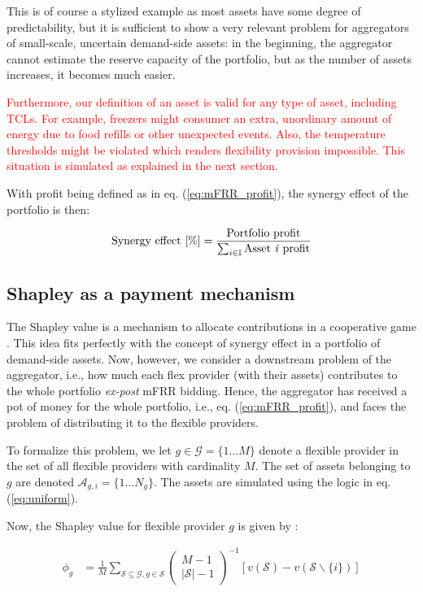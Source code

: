 \documentclass[lettersize,journal]{IEEEtran}
\newcommand{\red}[1]{\textcolor{red}{#1}}
\begin{document}
This is of course a stylized example as most assets have some degree of predictability, but it is sufficient to show a very relevant problem for aggregators of small-scale, uncertain demand-side assets: in the beginning, the aggregator cannot estimate the reserve capacity of the portfolio, but as the number of assets increases, it becomes much easier.

\red{Furthermore, our definition of an asset is valid for any type of asset, including TCLs. For example, freezers might consumer an extra, unordinary amount of energy due to food refills or other unexpected events. Also, the temperature thresholds might be violated which renders flexibility provision impossible. This situation is simulated as explained in the next section.}

With profit being defined as in eq. (\ref{eq:mFRR_profit}), the synergy effect of the portfolio is then:

\begin{align}\label{eq:synergy_effect}
    \text{Synergy effect [\%]} = \frac{ \text{Portfolio profit} }{ \sum_{i \in \mathbb{I}} \text{Asset \textit{i} profit} }
\end{align}


\subsection{Shapley as a payment mechanism}

The Shapley value is a mechanism to allocate contributions in a cooperative game \cite{shapley1997value}. This idea fits perfectly with the concept of synergy effect in a portfolio of demand-side assets. Now, however, we consider a downstream problem of the aggregator, i.e., how much each flex provider (with their assets) contributes to the whole portfolio \textit{ex-post} mFRR bidding. Hence, the aggregator has received a pot of money for the whole portfolio, i.e., eq. (\ref{eq:mFRR_profit}), and faces the problem of distributing it to the flexible providers.

To formalize this problem, we let $g \in \mathcal{G} = \{1 \hdots M \}$ denote a flexible provider in the set of all flexible providers with cardinality $M$. The set of assets belonging to $g$ are denoted $\mathcal{A}_{g,i} = \{1 \hdots N_g \}$. The assets are simulated using the logic in eq. (\ref{eq:uniform}).

Now, the Shapley value for flexible provider $g$ is given by \cite{shapley1997value}:

\begin{align}\label{eq:shap}
    \phi_g & = \frac{1}{M} \sum_{\mathcal{S} \subseteq \mathcal{G}, g \in \mathcal{S}}\left(\begin{array}{c}
                                                                                                    M-1 \\
                                                                                                    |\mathcal{S}|-1
                                                                                                \end{array}\right)^{-1}[v(\mathcal{S})-v(\mathcal{S} \backslash\{i\})]
\end{align}
\end{document}
